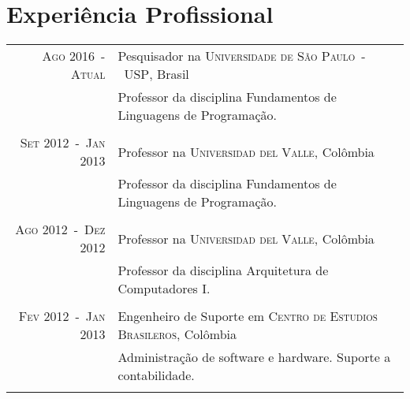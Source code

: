 \documentclass[a4paper,10pt]{article}
\begin{document}
\section{Experiência Profissional}
\begin{tabular}{rl}

    \textsc{Ago 2016~-~Atual}       & Pesquisador na \textsc{Universidade de São Paulo~-~USP}, Brasil \\
                                    &\footnotesize{Professor da disciplina Fundamentos de Linguagens de Programação.} \\
                                    &\\

    \textsc{Set 2012~-~Jan 2013}    & Professor na \textsc{Universidad del Valle}, Colômbia \\
                                    &\footnotesize{Professor da disciplina Fundamentos de Linguagens de Programação.} \\
                                    &\\

    \textsc{Ago 2012~-~Dez 2012}    & Professor na \textsc{Universidad del Valle}, Colômbia \\
                                    &\footnotesize{Professor da disciplina Arquitetura de Computadores I.} \\
                                    &\\

    \textsc{Fev 2012~-~Jan 2013}    & Engenheiro de Suporte em \textsc{Centro de Estudios Brasileros}, Colômbia \\
                                    &\footnotesize{Administração de software e hardware. Suporte a contabilidade.} \\
                                    &\\

\end{tabular}

\end{document}
